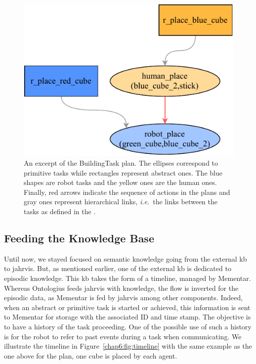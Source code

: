 \documentclass[a4paper,11pt,twoside]{StyleThese}
\begin{document}
\begin{figure}[!ht]
	\centering
	\includegraphics[width=0.5\linewidth]{figures/chapter2/excerpt_plan.pdf}
	\caption{An excerpt of the BuildingTask plan. The ellipses correspond to primitive tasks while rectangles represent abstract ones. The blue shapes are robot tasks and the yellow ones are the human ones. Finally, red arrows indicate the sequence of actions in the plans and gray ones represent hierarchical links, \textit{i.e.}~the links between the tasks as defined in the .}
	\label{chap6:fig:excerpt_plan}
\end{figure}

\subsection{Feeding the Knowledge Base}\label{chap6:subsec:feeding}
Until now, we stayed focused on semantic knowledge going from the external \acrshort{kb} to \acrshort{jahrvis}. But, as mentioned earlier, one of the external \acrshort{kb} is dedicated to episodic knowledge. This \acrshort{kb} takes the form of a timeline, managed by Mementar. Whereas Ontologius feeds \acrshort{jahrvis} with knowledge, the flow is inverted for the episodic data, as Mementar is fed by \acrshort{jahrvis} among other components. Indeed, when an abstract or primitive task is started or achieved, this information is sent to Mementar for storage with the associated ID and time stamp. The objective is to have a history of the task proceeding. One of the possible use of such a history is for the robot to refer to past events during a task when communicating. We illustrate the timeline in Figure~\ref{chap6:fig:timeline} with the same example as the one above for the plan, one cube is placed by each agent.
\end{document}
